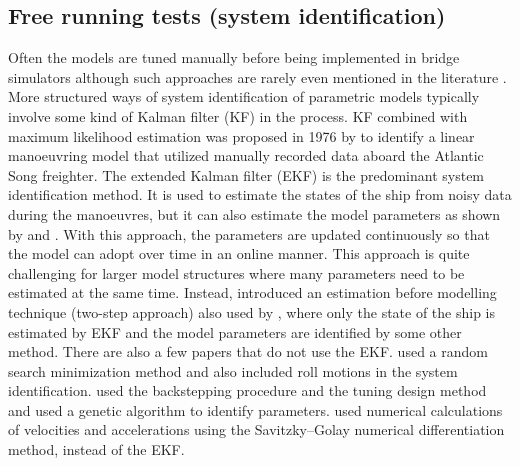 \subsection{Free running tests (system identification)} \label{sec:FT} %
Often the models are tuned manually before being implemented in bridge simulators although such approaches are rarely even mentioned in the literature \cite{sutuloAlgorithmOfflineIdentification2014}. More structured ways of system identification of parametric models typically involve some kind of Kalman filter (KF) in the process. KF combined with maximum likelihood estimation was proposed in 1976 by \textcite{astromIdentificationShipSteering1976} to identify a linear manoeuvring model that utilized manually recorded data aboard the Atlantic Song freighter. The extended Kalman filter (EKF) is the predominant system identification method. It is used to estimate the states of the ship from noisy data during the manoeuvres, but it can also estimate the model parameters as shown by \textcite{shiIdentificationShipManeuvering2009} and \textcite{pereraSystemIdentificationNonlinear2015}. With this approach, the parameters are updated continuously so that the model can adopt over time in an online manner. This approach is quite challenging for larger model structures where many parameters need to be estimated at the same time. Instead, \textcite{yoonIdentificationHydrodynamicCoefficients2003} introduced an estimation before modelling technique  (two-step approach) also used by \textcite{revestidoherreroTwostepIdentificationNonlinear2012}, where only the state of the ship is estimated by EKF and the model parameters are identified by some other method.  
There are also a few papers that do not use the EKF. \textcite{tianoMultivariableIdentificationShip1997} used a random search minimization method and also included roll motions in the system identification. \textcite{casadoIdentificationNonlinearShip2005} used the backstepping procedure and the tuning design method and \textcite{millerShipModelIdentification2021} used a genetic algorithm to identify parameters. 
\textcite{chillcceDatadrivenSystemIdentification2023} used numerical calculations of velocities and accelerations using the Savitzky–Golay numerical differentiation method, instead of the EKF.

